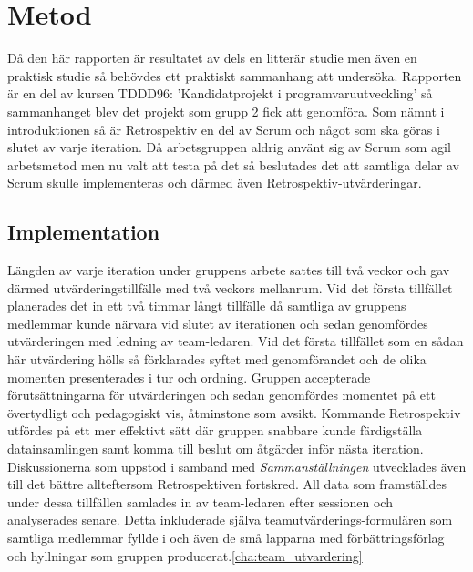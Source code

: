 



\section{Metod}
\label{cha:johan_n-method}

Då den här rapporten är resultatet av dels en litterär studie men även en praktisk studie så behövdes ett praktiskt sammanhang att undersöka.
Rapporten är en del av kursen TDDD96: 'Kandidatprojekt i programvaruutveckling' så sammanhanget blev det projekt som grupp 2 fick att genomföra.
Som nämnt i introduktionen så är Retrospektiv en del av Scrum och något som ska göras i slutet av varje iteration.
Då arbetsgruppen aldrig använt sig av Scrum som agil arbetsmetod men nu valt att testa på det så beslutades det att samtliga delar av Scrum skulle implementeras och därmed även Retrospektiv-utvärderingar.

\subsection{Implementation}
\label{sec:johan_n-implementation}

Längden av varje iteration under gruppens arbete sattes till två veckor och gav därmed utvärderingstillfälle med två veckors mellanrum. Vid det första tillfället planerades det in ett två timmar långt tillfälle då samtliga av gruppens medlemmar kunde närvara vid slutet av iterationen och sedan genomfördes utvärderingen med ledning av team-ledaren. Vid det första tillfället som en sådan här utvärdering hölls så förklarades syftet med genomförandet och de olika momenten presenterades i tur och ordning. Gruppen accepterade förutsättningarna för utvärderingen och sedan genomfördes momentet på ett övertydligt och pedagogiskt vis, åtminstone som avsikt. Kommande Retrospektiv utfördes på ett mer effektivt sätt där gruppen snabbare kunde färdigställa datainsamlingen samt komma till beslut om åtgärder inför nästa iteration. Diskussionerna som uppstod i samband med \textit{Sammanställningen} utvecklades även till det bättre allteftersom Retrospektiven fortskred. All data som framställdes under dessa tillfällen samlades in av team-ledaren efter sessionen och analyserades senare. Detta inkluderade själva teamutvärderings-formulären som samtliga medlemmar fyllde i och även de små lapparna med förbättringsförlag och hyllningar som gruppen producerat.\ref{cha:team_utvardering} 


